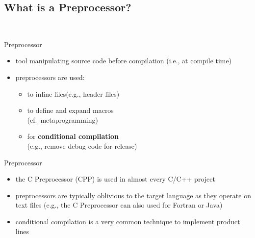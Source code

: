 \subsection{What is a Preprocessor?}
\begin{frame}{\myframetitle\ }
	\begin{mycolumns}
		\begin{definition}{Preprocessor}
			\begin{itemize}
				\item tool manipulating source code before compilation (i.e., at compile time)
				\item preprocessors are used:
					\begin{itemize}
						\item to inline files\hfill(e.g., header files)
						\item to define and expand macros\\\hfill(cf.\ metaprogramming)
						\item for \textbf{conditional compilation}\\\hfill(e.g., remove debug code for release)
					\end{itemize}
			\end{itemize}
		\end{definition}
	\mynextcolumn
		\begin{note}{Preprocessor}
			\begin{itemize}
				\item the C Preprocessor (CPP) is used in almost every C/C++ project
				\item preprocessors are typically oblivious to the target language as they operate on text files (e.g., the C Preprocessor can also used for Fortran or Java)
				\item conditional compilation is a very common technique to implement product lines
			\end{itemize}
		\end{note}
	\end{mycolumns}
\end{frame}


